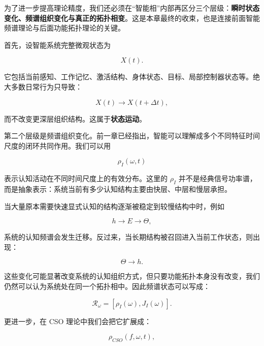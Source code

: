 为了进一步提高理论精度，我们还必须在“智能相”内部再区分三个层级：\textbf{瞬时状态变化、频谱组织变化与真正的拓扑相变}。这是本章最终的收束，也是连接前面智能频谱理论与后面功能拓扑理论的关键。

首先，设智能系统完整微观状态为

\begin{equation}
X(t).
\end{equation}

它包括当前感知、工作记忆、激活结构、身体状态、目标、局部控制器状态等。绝大多数日常行为只导致：

\begin{equation}
X(t)
\rightarrow
X(t+\Delta t),
\end{equation}

而不改变更深层组织结构。这属于\textbf{状态运动}。

第二个层级是频谱组织变化。前一章已经指出，智能可以理解成多个不同特征时间尺度的闭环共同作用。我们可以用

\begin{equation}
\rho_I(\omega,t)
\end{equation}

表示认知活动在不同时间尺度上的有效分布。这里的 $\rho_I$ 并不是经典信号功率谱，而是抽象表示：系统当前有多少认知结构主要由快层、中层和慢层承担。

当大量原本需要快速显式认知的结构逐渐被稳定到较慢结构中时，例如

\begin{equation}
h
\rightarrow
E
\rightarrow
\Theta,
\end{equation}

系统的认知频谱会发生迁移。反过来，当长期结构被召回进入当前工作状态，则出现：

\begin{equation}
\Theta
\rightarrow
h.
\end{equation}

这些变化可能显著改变系统的认知组织方式，但只要功能拓扑本身没有改变，我们仍然可以认为系统处在同一个拓扑相中。因此频谱状态可以写成：

\begin{equation}
\mathcal{R}_{\omega}
=
\left[
\rho_I(\omega),
J_I(\omega)
\right].
\end{equation}

更进一步，在 CSO 理论中我们会把它扩展成：

\begin{equation}
\rho_{CSO}(f,\omega,t),
\end{equation}

